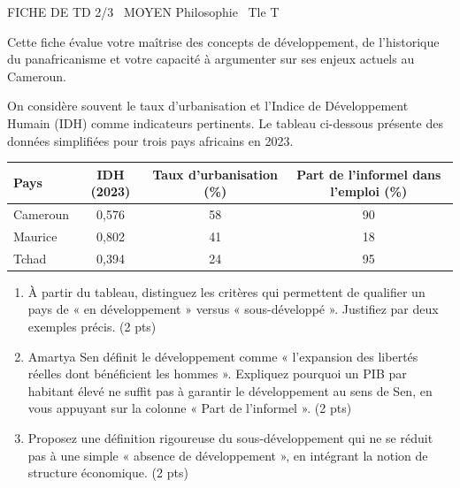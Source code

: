 \documentclass[11pt]{article}
\begin{document}
\begin{tcolorbox}[enhanced,colback=popink,colframe=popink,arc=10pt,boxrule=0pt,left=12pt,right=12pt,top=9pt,bottom=9pt]
{\color{white}\popxbold\small FICHE DE TD 2/3 \textbullet\ MOYEN \hfill Philosophie \textbullet\ Tle T\par}
\end{tcolorbox}
\vspace{4pt}
\noindent Cette fiche évalue votre maîtrise des concepts de développement, de l'historique du panafricanisme et votre capacité à argumenter sur ses enjeux actuels au Cameroun.

\begin{exercice}
    On considère souvent le taux d'urbanisation et l'Indice de Développement Humain (IDH) comme indicateurs pertinents. Le tableau ci-dessous présente des données simplifiées pour trois pays africains en 2023.

    \begin{center}
    \begin{tabular}{|l|c|c|c|}
    \hline
    \textbf{Pays} & \textbf{IDH (2023)} & \textbf{Taux d'urbanisation (\%)} & \textbf{Part de l'informel dans l'emploi (\%)} \\
    \hline
    Cameroun & 0,576 & 58 & 90 \\
    Maurice & 0,802 & 41 & 18 \\
    Tchad & 0,394 & 24 & 95 \\
    \hline
    \end{tabular}
    \end{center}

    \begin{enumerate}
        \item À partir du tableau, distinguez les critères qui permettent de qualifier un pays de « en développement » versus « sous-développé ». Justifiez par deux exemples précis. (2 pts)
        \item Amartya Sen définit le développement comme « l'expansion des libertés réelles dont bénéficient les hommes ». Expliquez pourquoi un PIB par habitant élevé ne suffit pas à garantir le développement au sens de Sen, en vous appuyant sur la colonne « Part de l'informel ». (2 pts)
        \item Proposez une définition rigoureuse du sous-développement qui ne se réduit pas à une simple « absence de développement », en intégrant la notion de structure économique. (2 pts)
    \end{enumerate}
\end{exercice}
\end{document}
